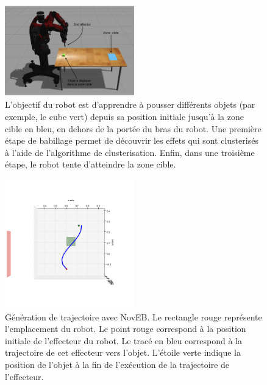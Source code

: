 \documentclass[draft]{llncs}
\begin{document}
\begin{figure}[ht]
  \begin{center}
    \includegraphics[width=0.5\textwidth]{figures/Experiment_setup_annoted_FR.png}
    \caption{L'objectif du robot est d'apprendre à pousser différents objets (par exemple, le cube vert) depuis sa position initiale jusqu'à la zone cible en bleu, en dehors de la portée du bras du robot. Une première étape de babillage permet de découvrir les effets qui sont clusterisés à l'aide de l'algorithme de clusterisation. Enfin, dans une troisième étape, le robot tente d'atteindre la zone cible.}
    \label{fig:setup}
  \end{center}
\end{figure}

\begin{figure}[ht]
  \begin{center}
    \includegraphics[width=0.5\textwidth]{figures/ns_trajectory.png}
    \caption{Génération de trajectoire avec NovEB. Le rectangle rouge représente l'emplacement du robot. Le point rouge correspond à la position initiale de l'effecteur du robot. Le tracé en bleu correspond à la trajectoire de cet effecteur vers l'objet. L'étoile verte indique la position de l'objet à la fin de l'exécution de la trajectoire de l'effecteur.}
    \label{fig:ns_traj}
  \end{center}
\end{figure}
\end{document}
